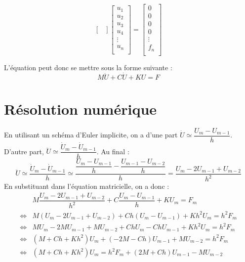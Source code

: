 \documentclass[10pt]{article}
\begin{document}
$$\begin{bmatrix}
\end{bmatrix}
\begin{bmatrix}
{u}_1\\
{u}_2\\
{u}_3\\
{u}_4\\
\vdots\\
{u}_n\\
\end{bmatrix} 
=
\begin{bmatrix}
0\\
0\\
0\\
0\\
\vdots\\
{f}_n\\
\end{bmatrix} 
$$

L'équation peut donc se mettre sous la forme suivante :
$$
M \ddot{U} + C \dot{U}+ K U = F 
$$

\section{Résolution numérique}

En utilisant un schéma d'Euler implicite, on a d'une part 
$\dot{U} \simeq \dfrac{U_{m}-U_{m-1}}{h} $. D'autre part, 
$\ddot{U} \simeq \dfrac{\dot{U}_{m}-\dot{U}_{m-1}}{h}$. Au final : 
$$
\ddot{U} \simeq \dfrac{\dot{U}_{m}-\dot{U}_{m-1}}{h}
\simeq \dfrac{ \dfrac{U_{m}-U_{m-1}}{h}- \dfrac{U_{m-1}-U_{m-2}}{h}}{h}
= \dfrac{ U_{m}-2U_{m-1}+U_{m-2}}{h^2}
$$
En substituant dans l'équation matricielle, on a donc : 
\begin{eqnarray*}
&M \dfrac{ U_{m}-2U_{m-1}+U_{m-2}}{h^2} + C \dfrac{U_{m}-U_{m-1}}{h} + K U_m = F _m \\
\Longleftrightarrow & 
M \left( U_{m}-2U_{m-1}+U_{m-2}\right) + Ch \left(U_{m}-U_{m-1}\right) 
+ K h^2 U_m = h^2 F_m \\
\Longleftrightarrow & 
M  U_{m}-2M U_{m-1}+M U_{m-2} + Ch U_{m}-Ch U_{m-1}
+ K h^2 U_m = h^2 F_m \\
\Longleftrightarrow & 
\left( M + Ch  + K h^2 \right)  U_m 
+ \left(-2M  -Ch  \right)U_{m-1}
+M U_{m-2} 
= h^2 F_m \\
\Longleftrightarrow & 
\left( M + Ch  + K h^2 \right)  U_m 
= h^2 F_m + \left(2M  +Ch  \right)U_{m-1} - M U_{m-2}  \\
\end{eqnarray*}

\else
\fi
\end{document}
